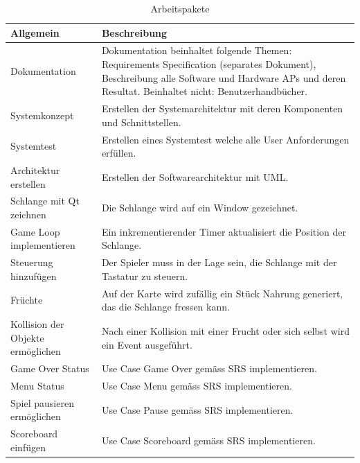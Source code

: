 \documentclass[a4paper, twosided, 11pt]{scrartcl}
\begin{document}
\begin{table}[H]
\caption{Arbeitspakete}
\renewcommand{\arraystretch}{1.3}
\begin{tabularx}{\textwidth}{lX}
  \toprule
  \bfseries Allgemein & \bfseries Beschreibung \\
  \midrule
  Dokumentation & Dokumentation beinhaltet folgende Themen: Requirements
  Specification (separates Dokument), Beschreibung alle Software und Hardware
  APs und deren Resultat. Beinhaltet nicht: Benutzerhandbücher. \\

  Systemkonzept & Erstellen der Systemarchitektur mit deren Komponenten und Schnittstellen. \\

  Systemtest & Erstellen eines Systemtest welche alle User Anforderungen erfüllen. \\

  \midrule

  Architektur erstellen & Erstellen der Softwarearchitektur mit UML. \\

  Schlange mit Qt zeichnen & Die Schlange wird auf ein Window gezeichnet. \\

  Game Loop implementieren & Ein inkrementierender Timer aktualisiert die
  Position der Schlange. \\

  Steuerung hinzuf\"ugen & Der Spieler muss in der Lage sein, die Schlange mit
  der Tastatur zu steuern. \\

  Fr\"uchte & Auf der Karte wird zufällig ein Stück Nahrung generiert, das die
  Schlange fressen kann. \\

  Kollision der Objekte ermöglichen & Nach einer Kollision mit einer Frucht
  oder sich selbst wird ein Event ausgeführt. \\

  Game Over Status & Use Case Game Over gem\"ass SRS implementieren. \\

  Menu Status & Use Case Menu gem\"ass SRS implementieren. \\

  Spiel pausieren erm\"oglichen & Use Case Pause gem\"ass SRS implementieren. \\

  Scoreboard einf\"ugen & Use Case Scoreboard gem\"ass SRS implementieren. \\

  \bottomrule
\end{tabularx}
\end{table}
\end{document}
